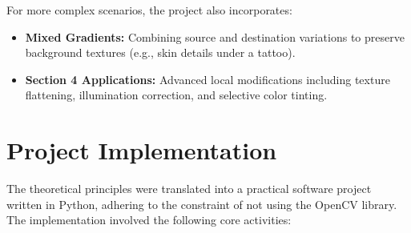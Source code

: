 \documentclass[12pt,a4paper]{report}
\begin{document}
For more complex scenarios, the project also incorporates:
\begin{itemize}
    \item \textbf{Mixed Gradients:} Combining source and destination variations to preserve background textures (e.g., skin details under a tattoo).
    \item \textbf{Section 4 Applications:} Advanced local modifications including texture flattening, illumination correction, and selective color tinting.
\end{itemize}

\section{Project Implementation}
The theoretical principles were translated into a practical software project written in Python, adhering to the constraint of not using the OpenCV library. The implementation involved the following core activities:
\end{document}
